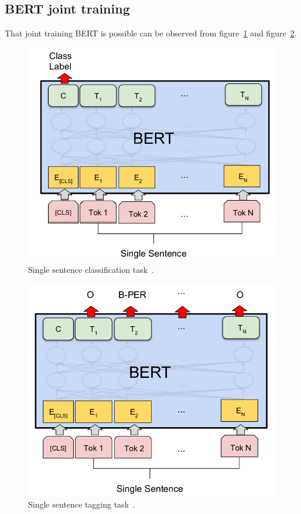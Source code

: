 \subsection{BERT joint training}
\label{subsec:bert_joint_training}

That joint training BERT is possible can be observed from figure~\ref{fig:bert_single_sentence} and figure~\ref{fig:bert_ner}.
\begin{figure}[htbp]
    \begin{center}
        \includegraphics[scale=0.3]{figures/bert_single_sentence.png}
    \end{center}
    \caption{Single sentence classification task~\cite[Figure 3]{devlin2018}.}
    \label{fig:bert_single_sentence}
\end{figure}

\begin{figure}[htbp]
    \begin{center}
        \includegraphics[scale=0.3]{figures/bert_ner.png}
    \end{center}
    \caption{Single sentence tagging task~\cite[Figure 3]{devlin2018}.}
    \label{fig:bert_ner}
\end{figure}

